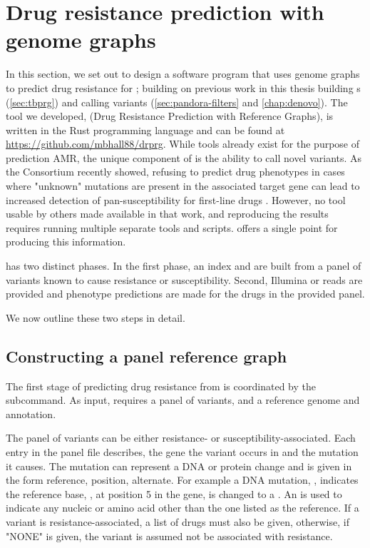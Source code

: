 \section{Drug resistance prediction with genome graphs}
In this section, we set out to design a software program that uses genome graphs to predict drug resistance for \mtb{}; building on previous work in this thesis building \mtb{} \prg{}s (\autoref{sec:tbprg}) and calling variants (\autoref{sec:pandora-filters} and \autoref{chap:denovo}). The tool we developed, \drprg{} (Drug Resistance Prediction with Reference Graphs), is written in the Rust programming language and can be found at \url{https://github.com/mbhall88/drprg}.
While tools already exist for the purpose of prediction AMR, the unique component of \drprg{} is the ability to call novel variants. As the \cryptic{} Consortium recently showed, refusing to predict drug phenotypes in cases where "unknown" mutations are present in the associated target gene can lead to increased detection of pan-susceptibility for first-line drugs \cite{cryptic2018}. However, no tool usable by others made available in that work, and reproducing the results requires running multiple separate tools and scripts. \drprg{} offers a single point for producing this information.

\drprg{} has two distinct phases. In the first phase, an index and \prg{} are built from a panel of variants known to cause resistance or susceptibility. Second, Illumina or \ont{} reads are provided and phenotype predictions are made for the drugs in the provided panel.

We now outline these two steps in detail.

\subsection{Constructing a panel reference graph}
\label{sec:drprg-index}
The first stage of predicting drug resistance from \drprg{} is coordinated by the  subcommand. As input,  requires a panel of variants, and a reference genome and annotation. 

The panel of variants can be either resistance- or susceptibility-associated. Each entry in the panel file describes, the gene the variant occurs in and the mutation it causes. The mutation can represent a DNA or protein change and is given in the form reference, position, alternate. For example a DNA mutation, , indicates the reference base, , at position 5 in the gene, is changed to a . An  is used to indicate any nucleic or amino acid other than the one listed as the reference. If a variant is resistance-associated, a list of drugs must also be given, otherwise, if "NONE" is given, the variant is assumed not be associated with resistance.

